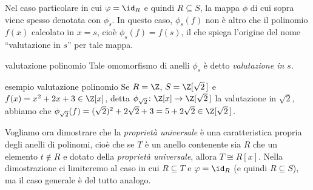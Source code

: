 \noindent Nel caso particolare in cui $\varphi=\id_R$ e quindi $R\subseteq S$, 
la mappa $\phi$ di cui sopra viene spesso denotata con $\phi_s$. 
In questo caso, $\phi_s(f)$ non è altro che il polinomio $f(x)$ calcolato in $x=s$, 
cioè $\phi_s(f)=f(s)$, il che spiega l'origine del nome ``valutazione in $s$'' per tale mappa.

\vspace{3mm}
\begin{defn}{valutazione polinomio}
Tale omomorfismo di anelli $\phi_s$ è detto \emph{valutazione in $s$}.
\end{defn}
\clearpage

\begin{example}[]{esempio valutazione polinomio}
Se $R=\Z$, $S=\Z[\sqrt{2}\,]$ e $f(x)=x^2+2x+3\in \Z[x]$, detta $\phi_{\sqrt{2}}\colon \Z[x]\to \Z[\sqrt{2}\,]$ 
la valutazione in $\sqrt{2}$, abbiamo che $\phi_{\sqrt{2}}(f)=(\sqrt{2})^2+2\sqrt{2}+3=5+2\sqrt{2}\in \Z[\sqrt{2}\,]$.
\end{example}

\noindent Vogliamo ora dimostrare che la \emph{proprietà universale} è una caratteristica propria degli anelli di polinomi, 
cioè che se $T$ è un anello contenente sia $R$ che un elemento $t\notin R$ e dotato della \emph{proprietà universale}, 
allora $T\cong R[x]$. Nella dimostrazione ci limiteremo al caso in cui $R\subseteq T$ e $\varphi=\id_R$ (e quindi $R\subseteq S$), 
ma il caso generale è del tutto analogo.

